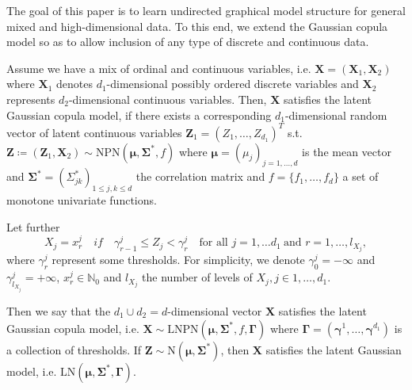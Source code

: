 
The goal of this paper is to  learn  undirected graphical model structure for general mixed and high-dimensional data. To this end, we extend the Gaussian copula model \citep{Liu09,Liu12,Xue12} 
so as to allow inclusion of any type of discrete and continuous data.    

\begin{definition}\label{latent_gaussian_cm}
    Assume we have a mix of ordinal and continuous variables, i.e. $\boldsymbol{X} = (\boldsymbol{X}_1,\boldsymbol{X}_2)$ where $\boldsymbol{X}_1$ denotes $d_1$-dimensional possibly ordered discrete variables and $\boldsymbol{X}_2$ represents $d_2$-dimensional continuous variables. Then, $\boldsymbol{X}$ satisfies the latent Gaussian copula model, if there exists a corresponding $d_1$-dimensional random vector of latent continuous variables $\boldsymbol{Z}_1 = (Z_1, \dots, Z_{d_1})^T$ s.t. $\boldsymbol{Z} \coloneqq (\boldsymbol{Z}_1, \boldsymbol{X}_2) \sim \text{NPN}(\boldsymbol{\mu}, \boldsymbol{\Sigma}^*, f)$ where $\boldsymbol{\mu} = (\mu_j)_{j=1,\dots,d}$ is the mean vector and $\boldsymbol{\Sigma}^* = (\Sigma^*_{jk})_{1\leq j,k \leq d}$ the correlation matrix and $f = \{f_1,\dots, f_d\}$ a set of monotone univariate functions. 
    
    \noindent Let further  
      \begin{equation}\label{latent_ordered}
            X_j = x^j_{r} \quad if \quad \gamma^j_{r-1} \leq Z_j < \gamma^j_r \quad \text{for all } j = 1, \dots d_1 \ \text{and } r = 1, \dots, l_{X_j}, 
    \end{equation}
    where $\gamma_r^j$ represent some thresholds. For simplicity, we denote $\gamma^j_0 = -\infty$ and $\gamma^j_{l_{X_{j}}} = +\infty$, $x_r^j \in \mathbb{N}_0$ and $l_{X_j}$ the number of levels of $X_j, j \in 1, \dots, d_1$. 

    \noindent Then we say that the $d_1 \cup d_2 = d$-dimensional vector $\boldsymbol{X}$ satisfies the latent Gaussian copula model, i.e. $\boldsymbol{X} \sim \text{LNPN}(\boldsymbol{\mu}, \boldsymbol{\Sigma}^*, f, \boldsymbol{\Gamma})$ where $\boldsymbol{\Gamma} = (\boldsymbol{\gamma}^1, \dots, \boldsymbol{\gamma}^{d_1})$ is a collection of thresholds. If $\boldsymbol{Z} \sim \text{N}(\boldsymbol{\mu}, \boldsymbol{\Sigma}^*)$, then $\boldsymbol{X}$ satisfies the latent Gaussian model, i.e. $\text{LN}(\boldsymbol{\mu}, \boldsymbol{\Sigma}^*, \boldsymbol{\Gamma})$.   
\end{definition}

